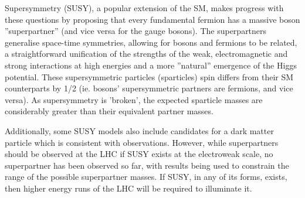 Supersymmetry (SUSY), a popular extension of the SM, makes progress with these questions by proposing that every fundamental fermion has a massive boson ''superpartner'' (and vice versa for the gauge bosons). 
The superpartners generalise space-time symmetries, allowing for bosons and fermions to be related, a straightforward unification of the strengths of the weak, electromagnetic and strong interactions at high energies and a more ''natural'' emergence of the Higgs potential. 
These supersymmetric particles (sparticles) spin differs from their SM counterparts by 1/2 (ie. bosons’ supersymmetric partners are fermions, and vice versa). 
As supersymmetry is 'broken', the expected sparticle masses are considerably greater than their equivalent partner masses. 

Additionally, some SUSY models also include candidates for a dark matter particle which is consistent with observations. 
However, while superpartners should be observed at the LHC if SUSY exists at the electroweak scale, no superpartner has been observed so far, with results being used to constrain the range of the possible superpartner masses. 
If SUSY, in any of its forms, exists, then higher energy runs of the LHC will be required to illuminate it. 


